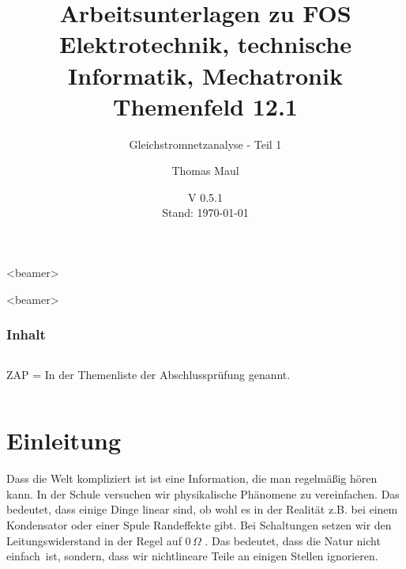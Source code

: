 \documentclass[aspectratio=169, ignorenonframetext]{beamer}
\title{Arbeitsunterlagen zu FOS Elektrotechnik, technische Informatik, Mechatronik Themenfeld 12.1}
\subtitle{Gleichstromnetzanalyse - Teil 1}
\date{V 0.5.1 \\ Stand: \today}%
\institute[BWS Hofheim]{Brühlwiesenschule, Hofheim}
\author{Thomas Maul}
\begin{document}
  \begin{frame}<beamer>
    \titlepage
  \end{frame}


\begin{frame}
  \partpage
\end{frame}
\begin{frame}<beamer>
  \frametitle{Inhalt}
  \begin{columns}
    \tableofcontents[sections={1-4},hidesubsections]%
    ZAP = In der Themenliste der Abschlussprüfung genannt.
    \tableofcontents[sections={5-},hidesubsections]%
  \end{columns}
\end{frame}

\section{Einleitung}
Dass die Welt kompliziert ist ist eine Information, die man regelmäßig hören kann. In der Schule versuchen wir physikalische Phänomene zu vereinfachen. Das bedeutet, dass einige Dinge linear sind, ob wohl es in der Realität z.B. bei einem Kondensator oder einer Spule Randeffekte gibt. Bei Schaltungen setzen wir den Leitungswiderstand in der Regel auf $0\, \Omega$ . Das bedeutet, dass die Natur nicht \glq einfach\grq \ ist, sondern, dass wir nichtlineare Teile an einigen Stellen ignorieren.
\end{document}
